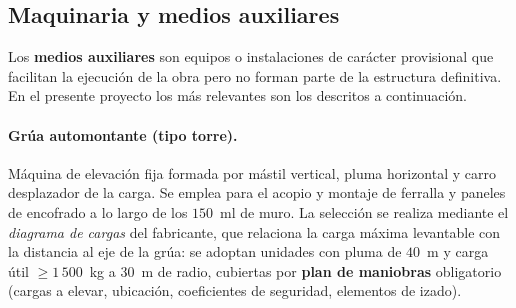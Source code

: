 \begin{table}[H]
  \centering
  \caption{Cuadrillas y equipos previstos para las unidades principales}
  \label{tab:cuadrillas}
\end{table}

\subsection{Maquinaria y medios auxiliares}
\label{subsec:maquinaria}

Los \textbf{medios auxiliares} son equipos o instalaciones de carácter
provisional que facilitan la ejecución de la obra pero no forman parte de
la estructura definitiva. En el presente proyecto los más relevantes son los
descritos a continuación.

\paragraph{Grúa automontante (tipo torre).}
Máquina de elevación fija formada por mástil vertical, pluma horizontal y
carro desplazador de la carga. Se emplea para el acopio y montaje de
ferralla y paneles de encofrado a lo largo de los $150$~ml de muro. La
selección se realiza mediante el \emph{diagrama de cargas} del fabricante,
que relaciona la carga máxima levantable con la distancia al eje de la grúa:
se adoptan unidades con pluma de $40$~m y carga útil $\geq 1\,500$~kg a
$30$~m de radio, cubiertas por \textbf{plan de maniobras} obligatorio
(cargas a elevar, ubicación, coeficientes de seguridad, elementos de izado).

